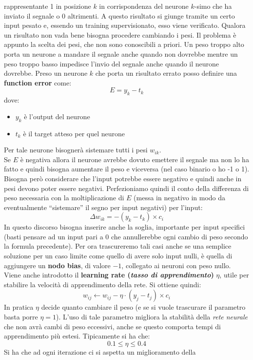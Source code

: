 \documentclass[a4paper,12pt, oneside]{book}
\begin{document}
rappresentante 1 in posizione $k$ in corrispondenza del neurone $k$-simo che ha
inviato il segnale o 0 altrimenti. A questo risultato si giunge tramite un certo
input pesato e, essendo un training supervisionato, esso viene
verificato. Qualora un risultato non vada bene bisogna procedere cambiando i
pesi. Il problema è appunto la scelta dei pesi, che non sono conoscibili a
priori. Un peso troppo alto porta un neurone a mandare il segnale anche quando
non dovrebbe mentre un peso troppo basso impedisce l'invio del segnale anche
quando il neurone dovrebbe. Preso un neurone $k$ che porta un risultato errato
posso definire una \textbf{function error} come:
\[E=y_k-t_k\]
dove:
\begin{itemize}
  \item $y_k$ è l'output del neurone
  \item $t_k$ è il target atteso per quel neurone
\end{itemize}
Per tale neurone bisognerà sistemare tutti i pesi $w_{ik}$.\\
Se $E$ è negativa allora il neurone avrebbe dovuto emettere il segnale ma non lo
ha fatto e quindi bisogna aumentare il peso e viceversa (nel caso binario o ho
-1 o 1). Bisogna però considerare che l'input potrebbe essere negativo e quindi
anche in pesi devono poter essere negativi. Perfezioniamo quindi il conto della
differenza di peso necessaria con la moltiplicazione di $E$ (messa in negativo
in modo da eventualmente ``sistemare'' il segno per input negativi) per l'input:
\[\Delta w_{ik}=-(y_k-t_k)\times c_i\]
In questo discorso bisogna inserire anche la soglia, importante per input
specifici (basti pensare ad un input pari a 0 che annullerebbe ogni cambio di
peso secondo la formula precedente). Per ora trascureremo tali casi anche se una
semplice soluzione per un caso limite come quello di avere solo input nulli, è
quella di aggiungere un \textbf{nodo bias}, di valore $-1$, collegato ai neuroni
con peso nullo.\\
Viene anche introdotto il \textbf{learning rate (\textit{tasso di
    apprendimento})} $\eta$, utile per stabilire la velocità di apprendimento
della rete. Si ottiene quindi:
\[w_{ij}\gets w_{ij}-\eta\cdot(y_j-t_j)\times c_i\]
In pratica $\eta$ decide quanto cambiare il peso (e se si vuole trascurare il
parametro basta porre $\eta =1$). L'uso di tale parametro migliora la stabilità
della \textit{rete neurale} che non avrà cambi di peso eccessivi, anche se
questo comporta tempi di apprendimento più estesi. Tipicamente si ha che:
\[0.1\leq\eta\leq 0.4\]
Si ha che ad ogni iterazione ci si aspetta un miglioramento della
\end{document}
